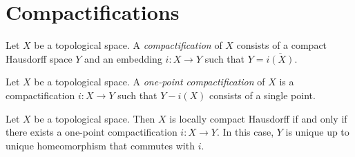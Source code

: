 \section{Compactifications}

\begin{definition}[Compactification]
    Let $X$ be a topological space. A \emph{compactification} of $X$ consists of a compact Hausdorff
    space $Y$ and an embedding $i : X \rightarrow Y$ such that $Y = \overline{i(X)}$.
\end{definition}

\begin{definition}
    Let $X$ be a topological space. A \emph{one-point compactification} of $X$ is a compactification
    $i : X \rightarrow Y$ such that $Y - i(X)$ consists of a single point.
\end{definition}

\begin{theorem}
    Let $X$ be a topological space. Then $X$ is locally compact Hausdorff if and only if there exists
    a one-point compactification $i : X \rightarrow Y$. In this case,
    $Y$ is unique up to unique homeomorphism that commutes with $i$.
\end{theorem}

